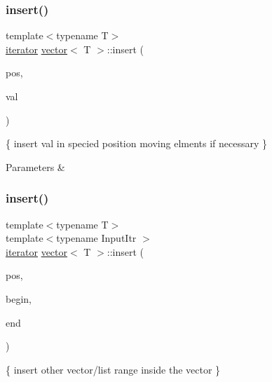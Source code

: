 \subsubsection{\texorpdfstring{insert()}{insert()}\hspace{0.1cm}{\footnotesize\ttfamily [1/3]}}
{\footnotesize\ttfamily template$<$typename T$>$ \\
\hyperlink{classMyIterator}{iterator} \hyperlink{classvector}{vector}$<$ T $>$\+::insert (\begin{DoxyParamCaption}\item[{\hyperlink{classMyIterator}{iterator}}]{pos,  }\item[{\hyperlink{classvector_aad263433b4072dfbc26ace0df6441960}{const\+\_\+reference}}]{val }\end{DoxyParamCaption})\hspace{0.3cm}{\ttfamily [inline]}}



\{ insert val in specied position moving elments if necessary \} 


\begin{DoxyParams}{Parameters}
{\em } & \\
\hline
\end{DoxyParams}
\mbox{\label{classvector_a2d147bbf19573f256d0dfcafd909295b}} 
\subsubsection{\texorpdfstring{insert()}{insert()}\hspace{0.1cm}{\footnotesize\ttfamily [2/3]}}
{\footnotesize\ttfamily template$<$typename T$>$ \\
template$<$typename Input\+Itr $>$ \\
\hyperlink{classMyIterator}{iterator} \hyperlink{classvector}{vector}$<$ T $>$\+::insert (\begin{DoxyParamCaption}\item[{\hyperlink{classMyIterator}{iterator}}]{pos,  }\item[{Input\+Itr}]{begin,  }\item[{Input\+Itr}]{end }\end{DoxyParamCaption})\hspace{0.3cm}{\ttfamily [inline]}}



\{ insert other vector/list range inside the vector \} 


